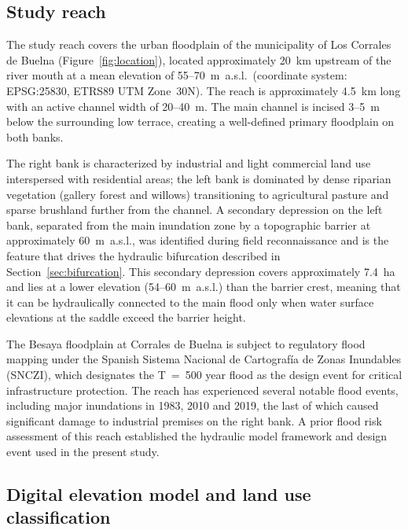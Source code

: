 \documentclass[review,12pt]{elsarticle}
\begin{document}
\subsection{Study reach}
\label{sec:reach}

The study reach covers the urban floodplain of the municipality of
Los Corrales de Buelna (Figure~\ref{fig:location}), located approximately
20~km upstream of the river mouth at a mean elevation of 55--70~m~a.s.l.\
(coordinate system: EPSG:25830, ETRS89 UTM Zone~30N).
The reach is approximately 4.5~km long with an active channel width of
20--40~m.
The main channel is incised 3--5~m below the surrounding low terrace,
creating a well-defined primary floodplain on both banks.

The right bank is characterized by industrial and light commercial land use
interspersed with residential areas; the left bank is dominated by dense
riparian vegetation (gallery forest and willows) transitioning to
agricultural pasture and sparse brushland further from the channel.
A secondary depression on the left bank, separated from the main inundation
zone by a topographic barrier at approximately 60~m~a.s.l., was identified
during field reconnaissance and is the feature that drives the hydraulic
bifurcation described in Section~\ref{sec:bifurcation}.
This secondary depression covers approximately 7.4~ha and lies at a lower
elevation (54--60~m~a.s.l.) than the barrier crest, meaning that it can be
hydraulically connected to the main flood only when water surface elevations
at the saddle exceed the barrier height.

The Besaya floodplain at Corrales de Buelna is subject to regulatory
flood mapping under the Spanish Sistema Nacional de Cartograf\'ia de Zonas
Inundables (SNCZI), which designates the T~=~500 year flood as the design
event for critical infrastructure protection.
The reach has experienced several notable flood events, including major
inundations in 1983, 2010 and 2019, the last of which caused significant
damage to industrial premises on the right bank.
A prior flood risk assessment of this reach \citep{navas2018rop} established
the hydraulic model framework and design event used in the present study.

\subsection{Digital elevation model and land use classification}
\label{sec:dem}
\end{document}
